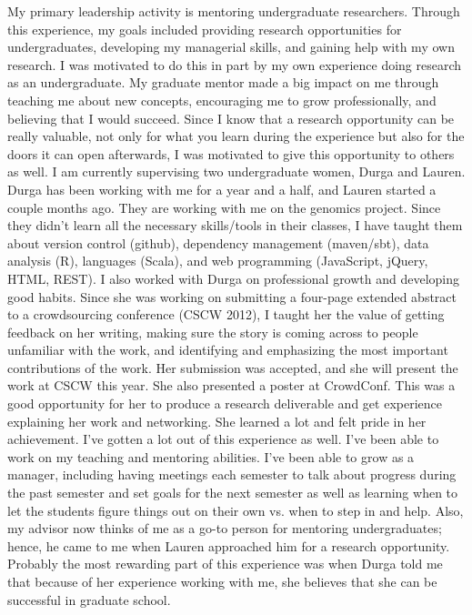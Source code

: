 \documentclass{article}
\begin{document}
My primary leadership activity is mentoring undergraduate researchers.
Through this experience, my goals included providing research opportunities for undergraduates, developing my managerial skills, and gaining help with my own research.
I was motivated to do this in part by my own experience doing research as an undergraduate.
My graduate mentor made a big impact on me through teaching me about new concepts, encouraging me to grow professionally, and believing that I would succeed.
Since I know that a research opportunity can be really valuable, not only for what you learn during the experience but also for the doors it can open afterwards, I was motivated to give this opportunity to others as well.
I am currently supervising two undergraduate women, Durga and Lauren.
Durga has been working with me for a year and a half, and Lauren started a couple months ago.
They are working with me on the genomics project.
Since they didn't learn all the necessary skills/tools in their classes, I have taught them about version control (github), dependency management (maven/sbt), data analysis (R), languages (Scala), and web programming (JavaScript, jQuery, HTML, REST).
I also worked with Durga on professional growth and developing good habits.
Since she was working on submitting a four-page extended abstract to a crowdsourcing conference (CSCW 2012), I taught her the value of getting feedback on her writing, making sure the story is coming across to people unfamiliar with the work, and identifying and emphasizing the most important contributions of the work.
Her submission was accepted, and she will present the work at CSCW this year.
She also presented a poster at CrowdConf.
This was a good opportunity for her to produce a research deliverable and get experience explaining her work and networking.
She learned a lot and felt pride in her achievement.
I've gotten a lot out of this experience as well.
I've been able to work on my teaching and mentoring abilities.
I've been able to grow as a manager, including having meetings each semester to talk about progress during the past semester and set goals for the next semester as well as learning when to let the students figure things out on their own vs. when to step in and help.
Also, my advisor now thinks of me as a go-to person for mentoring undergraduates; hence, he came to me when Lauren approached him for a research opportunity.
Probably the most rewarding part of this experience was when Durga told me that because of her experience working with me, she believes that she can be successful in graduate school.
\end{document}
